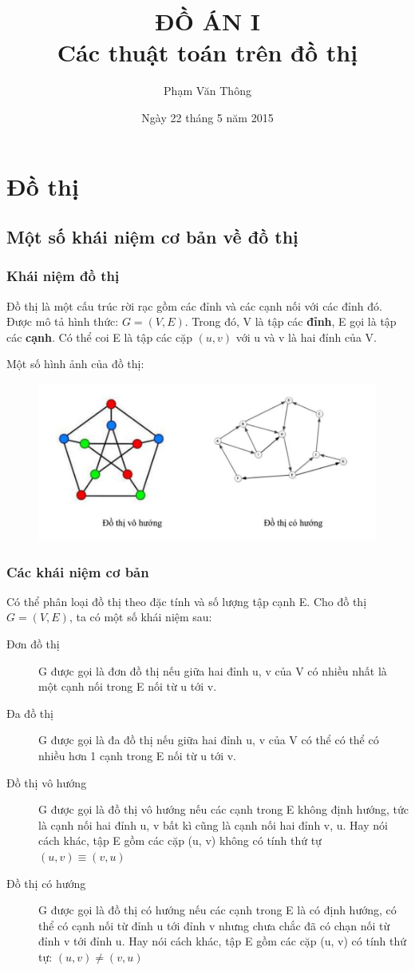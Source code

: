 \documentclass[a4paper,10pt]{article}
\title{\textbf{ĐỒ ÁN I }\\Các thuật toán trên đồ thị}
\author{Phạm Văn Thông}
\date{Ngày 22 tháng 5 năm 2015}
\begin{document}
\section{Đồ thị}
\subsection{Một số khái niệm cơ bản về đồ thị}
\subsubsection{Khái niệm đồ thị}
Đồ thị là một cấu trúc rời rạc gồm các đỉnh và các cạnh nối với các đỉnh đó. Được mô tả hình thức: $G = (V, E)$. Trong đó, V là tập các \textbf{đỉnh}, E gọi là tập các \textbf{cạnh}. Có thể coi E là tập các cặp $(u, v)$ với u và v là hai đỉnh của V.

Một số hình ảnh của đồ thị:
\begin{figure}[h!]
  \centering
\includegraphics[scale=0.5]{images/pic1.png}
\end{figure}

\subsubsection{Các khái niệm cơ bản}
Có thể phân loại đồ thị theo đặc tính và số lượng tập cạnh E. Cho đồ thị $G = (V, E)$, ta có một số khái niệm sau:
\begin{description}
\item[Đơn đồ thị ] G được gọi là đơn đồ thị nếu giữa hai đỉnh u, v của V có nhiều nhất là một cạnh nối trong E nối từ u tới v.
\item[Đa đồ thị] G được gọi là đa đồ thị nếu giữa hai đỉnh u, v của V có thể có thể có nhiều hơn 1 cạnh trong E nối từ u tới v.
\item[Đồ thị vô hướng] G được gọi là đồ thị vô hướng nếu các cạnh trong E không định hướng, tức là cạnh nối hai đỉnh u, v bất kì cũng là cạnh nối hai đỉnh v, u. Hay nói cách khác, tập E gồm các cặp (u, v) không có tính thứ tự $(u, v) \equiv (v, u)$
\item[Đồ thị có hướng] G được gọi là đồ thị có hướng nếu các cạnh trong E là có định hướng, có thể có cạnh nối từ đỉnh u tới đỉnh v nhưng chưa chắc đã có chạn nối từ đỉnh v tới đỉnh u. Hay nói cách khác, tập E gồm các cặp (u, v) có tính thứ tự: $(u, v) \neq (v, u)$
\end{description}
\end{document}
